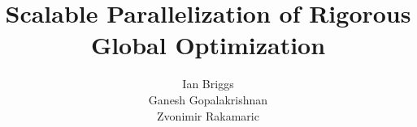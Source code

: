 \documentclass{acm_proc_article-sp}
\begin{document}
\title{Scalable Parallelization of Rigorous Global Optimization}


%
%
%
%
%

%
\author{
%
%
\alignauthor
Ian Briggs\\
\alignauthor
Ganesh Gopalakrishnan\\
\alignauthor
Zvonimir Rakamaric\\
}
\end{document}
